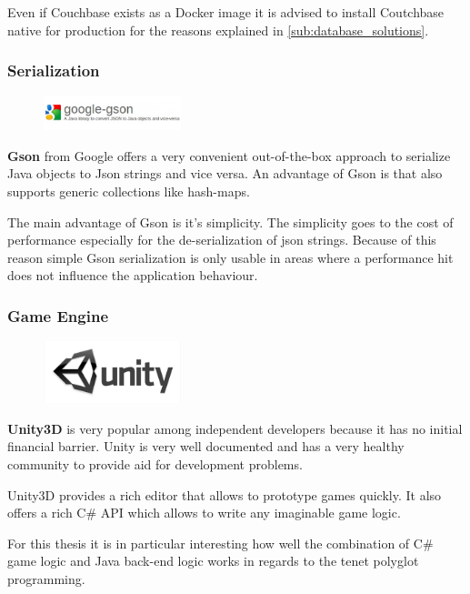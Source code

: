 Even if Couchbase exists as a Docker image it is advised to install
Coutchbase native for production for the reasons explained in
\autoref{sub:database_solutions}.
    
\subsubsection{Serialization}

\begin{figure}
    \includegraphics[width=4cm]{images/dependencies/google-gson}
\end{figure}

\textbf{Gson} from Google offers a very convenient out-of-the-box approach to
serialize Java objects to Json strings and vice versa. An advantage of Gson is that
also supports generic collections like hash-maps.

The main advantage of Gson is it's simplicity. The simplicity goes to the cost
of performance especially for the de-serialization of json strings.
Because of this reason simple Gson serialization is only usable in areas where a
performance hit does not influence the application behaviour.

\subsubsection{Game Engine}

\begin{figure}
    \includegraphics[width=4cm]{images/dependencies/Unity3D}
\end{figure}
    
\textbf{Unity3D} is very popular among independent developers because it has no
initial financial barrier. Unity is very well documented and has a very
healthy community to provide aid for development problems.

Unity3D provides a rich editor that allows to prototype games quickly. It
also offers a rich C\# API which allows to write any imaginable game logic. 

For this thesis it is in particular interesting how well the combination of
C\# game logic and Java back-end logic works in regards to the \ms{} tenet
polyglot programming.
    


